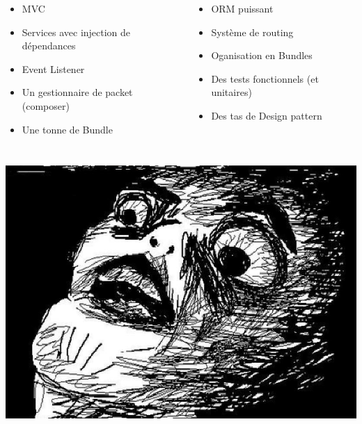\documentclass[12pt, francais]{beamer}
\begin{document}
\begin{frame}
	\pause
	\begin{block}{}
		\begin{columns}
				\begin{itemize}
					\item MVC  \\
					\item Services avec injection de d\'ependances  \\
					\item Event Listener  \\
					\item Un gestionnaire de packet (composer)  \\
					\item Une tonne de Bundle  \\
				\end{itemize}
				\begin{itemize}
					\item ORM puissant \\
					\item Syst\`eme de routing \\
					\item Oganisation en Bundles \\
					\item Des tests fonctionnels (et unitaires) \\
					\item Des tas de Design pattern  \\
				\end{itemize}
		\end{columns}
	\end{block}
\end{frame}

\begin{frame}
\end{frame}

\begin{frame}
	
	\pause
	\vspace*{-6cm}
	\begin{center}
		\includegraphics[width=.5\linewidth]{Pictures/OhCrap.png}
	\end{center}
\end{frame}
\end{document}
